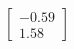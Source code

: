 \documentclass[preview]{standalone}
\begin{document}
\begin{align*}
\begin{bmatrix} -0.59 \\ 1.58 \end{bmatrix}
\end{align*}
\end{document}
